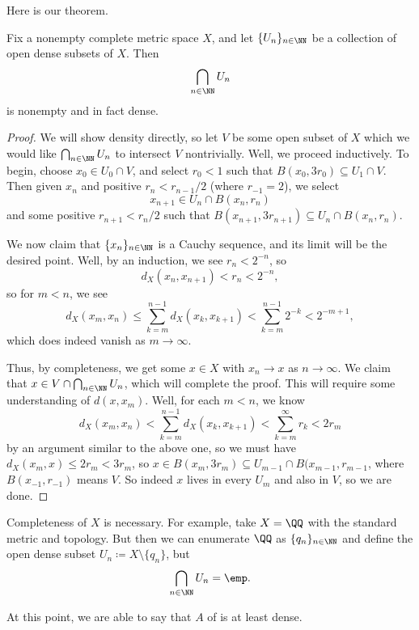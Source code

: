 \documentclass[../notes.tex]{subfiles}
\begin{document}
Here is our theorem.
\begin{theorem}[Baire] \label{thm:baire-1}
	Fix a nonempty complete metric space $X$, and let $\{U_n\}_{n\in\NN}$ be a collection of open dense subsets of $X$. Then
	\[\bigcap_{n\in\NN}U_n\]
	is nonempty and in fact dense.
\end{theorem}
\begin{proof}
	We will show density directly, so let $V$ be some open subset of $X$ which we would like $\bigcap_{n\in\NN}U_n$ to intersect $V$ nontrivially. Well, we proceed inductively. To begin, choose $x_0\in U_0\cap V$, and select $r_0<1$ such that $B(x_0,3r_0)\subseteq U_1\cap V$. Then given $x_n$ and positive $r_n<r_{n-1}/2$ (where $r_{-1}=2$), we select
	\[x_{n+1}\in U_n\cap B(x_n,r_n)\]
	and some positive $r_{n+1}<r_n/2$ such that $B(x_{n+1},3r_{n+1})\subseteq U_n\cap B(x_n,r_n)$.

	We now claim that $\{x_n\}_{n\in\NN}$ is a Cauchy sequence, and its limit will be the desired point. Well, by an induction, we see $r_n<2^{-n}$, so
	\[d_X(x_n,x_{n+1})<r_n<2^{-n},\]
	so for $m<n$, we see
	\[d_X(x_m,x_n)\le\sum_{k=m}^{n-1}d_X(x_k,x_{k+1})<\sum_{k=m}^{n-1}2^{-k}<2^{-m+1},\]
	which does indeed vanish as $m\to\infty$.

	Thus, by completeness, we get some $x\in X$ with $x_n\to x$ as $n\to\infty$. We claim that $x\in V\cap\bigcap_{n\in\NN}U_n$, which will complete the proof. This will require some understanding of $d(x,x_m)$. Well, for each $m<n$, we know
	\[d_X(x_m,x_n)<\sum_{k=m}^{n-1}d_X(x_k,x_{k+1})<\sum_{k=m}^\infty r_k<2r_m\]
	by an argument similar to the above one, so we must have $d_X(x_m,x)\le2r_m<3r_m$, so $x\in B(x_m,3r_m)\subseteq U_{m-1}\cap B(x_{m-1},r_{m-1}$, where $B(x_{-1},r_{-1})$ means $V$. So indeed $x$ lives in every $U_m$ and also in $V$, so we are done.
\end{proof}
\begin{remark}
	Completeness of $X$ is necessary. For example, take $X=\QQ$ with the standard metric and topology. But then we can enumerate $\QQ$ as $\{q_n\}_{n\in\NN}$ and define the open dense subset $U_n\coloneqq X\setminus\{q_n\}$, but
	\[\bigcap_{n\in\NN}U_n=\emp.\]
\end{remark}
At this point, we are able to say that $A$ of  is at least dense.
\end{document}
